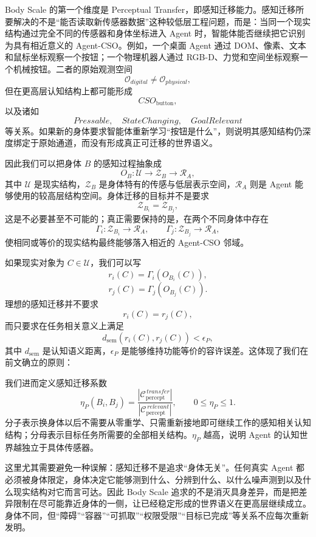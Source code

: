 Body Scale 的第一个维度是 Perceptual Transfer，即感知迁移能力。感知迁移所要解决的不是“能否读取新传感器数据”这种较低层工程问题，而是：当同一个现实结构通过完全不同的传感器和身体坐标进入 Agent 时，智能体能否继续把它识别为具有相近意义的 Agent-CSO。例如，一个桌面 Agent 通过 DOM、像素、文本和鼠标坐标观察一个按钮；一个物理机器人通过 RGB-D、力觉和空间坐标观察一个机械按钮。二者的原始观测空间
\[
\mathcal O_{digital}
\neq
\mathcal O_{physical},
\]
但在更高层认知结构上都可能形成
\[
CSO_{\text{button}},
\]
以及诸如
\[
Pressable,\quad StateChanging,\quad GoalRelevant
\]
等关系。如果新的身体要求智能体重新学习“按钮是什么”，则说明其感知结构仍深度绑定于原始通道，而没有形成真正可迁移的世界语义。

因此我们可以把身体 $B$ 的感知过程抽象成
\[
O_B:
\mathcal U
\rightarrow
\mathcal Z_B
\rightarrow
\mathcal R_A,
\]
其中 $\mathcal U$ 是现实结构，$\mathcal Z_B$ 是身体特有的传感与低层表示空间，$\mathcal R_A$ 则是 Agent 能够使用的较高层结构空间。身体迁移的目标并不是要求
\[
\mathcal Z_{B_i}
=
\mathcal Z_{B_j},
\]
这是不必要甚至不可能的；真正需要保持的是，在两个不同身体中存在
\[
\Gamma_i:\mathcal Z_{B_i}\rightarrow\mathcal R_A,
\qquad
\Gamma_j:\mathcal Z_{B_j}\rightarrow\mathcal R_A,
\]
使相同或等价的现实结构最终能够落入相近的 Agent-CSO 邻域。

如果现实对象为 $C\in\mathcal U$，我们可以写
\[
r_i(C)
=
\Gamma_i(O_{B_i}(C)),
\]
\[
r_j(C)
=
\Gamma_j(O_{B_j}(C)).
\]
理想的感知迁移并不要求
\[
r_i(C)=r_j(C),
\]
而只要求在任务相关意义上满足
\[
d_{\mathrm{sem}}
\left(
r_i(C),
r_j(C)
\right)
<
\epsilon_P,
\]
其中 $d_{\mathrm{sem}}$ 是认知语义距离，$\epsilon_P$ 是能够维持功能等价的容许误差。这体现了我们在前文确立的原则：
\begin{statementbox}
\centering
{}
\end{statementbox}

我们进而定义感知迁移系数
\[
\eta_P(B_i,B_j)
=
\frac{
\left|
\mathcal C_{\mathrm{percept}}^{\,transfer}
\right|
}{
\left|
\mathcal C_{\mathrm{percept}}^{\,relevant}
\right|
},
\qquad
0\leq \eta_P\leq 1.
\]
分子表示换身体以后不需要从零重学、只需重新接地即可继续工作的感知相关认知结构；分母表示目标任务所需要的全部相关结构。$\eta_P$ 越高，说明 Agent 的认知世界越独立于具体传感器。

这里尤其需要避免一种误解：感知迁移不是追求“身体无关”。任何真实 Agent 都必须被身体限定，身体决定它能够测到什么、分辨到什么、以什么噪声测到以及什么现实结构对它而言可达。因此 Body Scale 追求的不是消灭具身差异，而是把差异限制在尽可能靠近身体的一侧，让已经稳定形成的世界语义在更高层继续成立。身体不同，但“障碍”“容器”“可抓取”“权限受限”“目标已完成”等关系不应每次重新发明。

